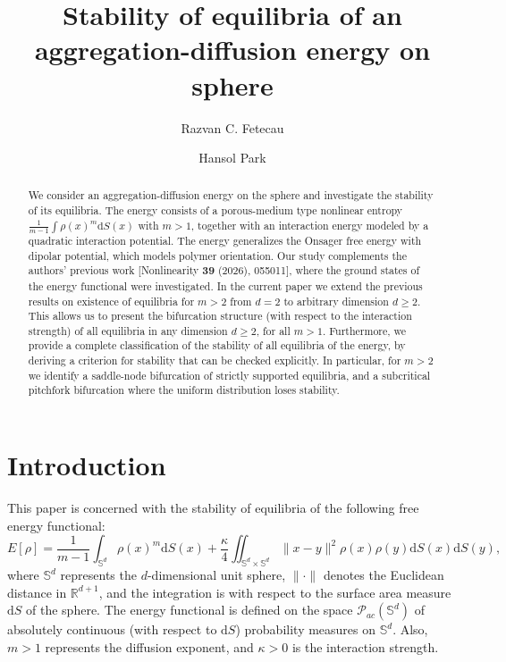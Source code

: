 \documentclass[11pt]{amsart}
\title[]{Stability of equilibria of an aggregation-diffusion energy on sphere}
\author[Fetecau]{Razvan C. Fetecau}
\author[Park]{Hansol Park}
\newcommand{\bbr}{\mathbb R}
\newcommand{\bbs}{\mathbb S}
\newcommand{\dS}{\mathrm{d}S} %
\newcommand{\dx}{\mathrm{d}S (x)}
\newcommand{\dy}{\mathrm{d}S (y)}
\newcommand{\dm}{d} %
\begin{document}


\begin{abstract}
We consider an aggregation-diffusion energy on the sphere and investigate the stability of its equilibria. The energy consists of a porous-medium type nonlinear entropy $\frac{1}{m-1}\int \rho(x)^m\dx$ with $m>1$, together with an interaction energy modeled by a quadratic interaction potential. The energy generalizes the Onsager free energy with dipolar potential, which models polymer orientation. Our study complements the authors' previous work [Nonlinearity {\bf 39} (2026), 055011], where the ground states of the energy functional were investigated. In the current paper we extend the previous results on existence of equilibria for $m>2$ from $\dm =2$ to arbitrary dimension $\dm \geq 2$. This allows us to present the bifurcation structure (with respect to the interaction strength) of all equilibria in any dimension $\dm \geq 2$, for all $m>1$.  Furthermore, we provide a complete classification of the stability of all equilibria of the energy, by deriving a criterion for stability that can be checked explicitly. In particular, for $m>2$ we identify a saddle-node bifurcation of strictly supported equilibria, and a subcritical pitchfork bifurcation where the uniform distribution loses stability.
\end{abstract}

\maketitle 


\section{Introduction}
\label{sect:intro}
This paper is concerned with the stability of equilibria of the following free energy functional:
\begin{equation}
\label{energy-sphere}
E[\rho]=\frac{1}{m-1}\int_{\bbs^\dm}\rho(x)^m \dx+\frac{\kappa}{4}\iint_{\bbs^\dm\times \bbs^\dm}\|x-y\|^2\rho(x)\rho(y) \dx\dy,
\end{equation}
where $\bbs^\dm$ represents the $\dm$-dimensional unit sphere, $\|\cdot\|$ denotes the Euclidean distance in $\bbr^{\dm+1}$, and the integration is with respect to the surface area measure $\dS$ of the sphere. The energy functional is defined on the space $\mathcal{P}_{ac}(\bbs^\dm)$ of absolutely continuous (with respect to $\dS$) probability measures on $\bbs^\dm$. Also, $m>1$ represents the diffusion exponent, and $\kappa>0$ is the interaction strength. 
\end{document}

